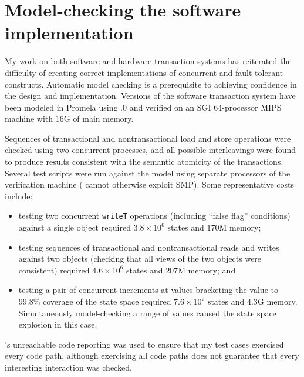 \chapter{Model-checking the software implementation}\label{sec:verification}

My work on both software and hardware transaction systems has
reiterated the difficulty of creating correct implementations of
concurrent and fault-tolerant constructs.  Automatic model checking is
a prerequisite to achieving confidence in the design and implementation.
Versions of the software transaction system have been modeled in
Promela using .0 and verified on an SGI 64-processor MIPS
machine with 16G of main memory.

Sequences of transactional and nontransactional load and store
operations were checked using two concurrent processes, and all possible
interleavings were found to produce results consistent with
the semantic atomicity of the transactions.  
Several test scripts were run against the
model using separate processors of the verification machine (\Spin
cannot otherwise exploit SMP).  Some representative costs include:
\begin{itemize}
\item testing two concurrent {\tt writeT} operations (including
  ``false flag'' conditions) against a single object required $3.8\times
  10^6$ states and $170$M memory;
\item testing sequences of transactional and nontransactional reads
  and writes against two objects (checking that all views of the two
  objects were consistent) required $4.6\times 10^6$ states and $207$M
  memory; and
\item testing a pair of concurrent increments at values bracketing the
  \FLAG value to 99.8\% coverage of the state space required
  $7.6\times 10^7$ states and $4.3$G memory.  Simultaneously
  model-checking a range of values caused the state space explosion
  in this case.
\end{itemize}
\Spin's unreachable code reporting was used to ensure that my test
cases exercised every code path, although exercising all code paths
does not guarantee that
every interesting interaction was checked.

